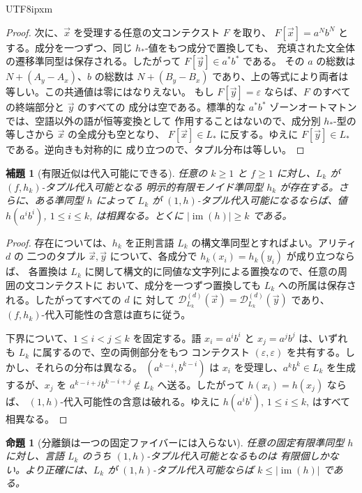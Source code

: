 \documentclass[10pt,a4paper]{article}
\newtheorem{lemma}[theorem]{補題}
\newtheorem{proposition}[theorem]{命題}
\theoremstyle{remark}
\newcommand{\D}{\mathcal{D}}
\newcommand{\tuple}[1]{\vec{#1}}
\newcommand{\eps}{\varepsilon}
\begin{document}
\begin{CJK}{UTF8}{ipxm}
\begin{proof}
次に、\(\tuple x\) を受理する任意の文コンテクスト \(F\) を取り、
\(F[\tuple x]=a^N b^N\) とする。成分を一つずつ、同じ \(h_*\)-値をもつ成分で置換しても、
充填された文全体の遷移準同型は保存される。したがって \(F[\tuple y]\in a^*b^*\) である。
その \(a\) の総数は \(N+(A_y-A_x)\)、\(b\) の総数は
\(N+(B_y-B_x)\) であり、上の等式により両者は等しい。この共通値は零にはなりえない。
もし \(F[\tuple y]=\eps\) ならば、\(F\) のすべての終端部分と \(\tuple y\) のすべての
成分は空である。標準的な \(a^*b^*\) ゾーンオートマトンでは、空語以外の語が恒等変換として
作用することはないので、成分別 \(h_*\)-型の等しさから \(\tuple x\) の全成分も空となり、
\(F[\tuple x]\in L_*\) に反する。ゆえに \(F[\tuple y]\in L_*\) である。逆向きも対称的に
成り立つので、タプル分布は等しい。
\end{proof}

\begin{lemma}[有限近似は代入可能にできる]
\label{lem:finite-approximants-substitutable}
任意の \(k\ge1\) と \(f\ge1\) に対し、\(L_k\) が \((f,h_k)\)-タプル代入可能となる
明示的有限モノイド準同型 \(h_k\) が存在する。さらに、ある準同型 \(h\) によって \(L_k\) が
\((1,h)\)-タプル代入可能になるならば、値
\(h(a^i b^i)\), \(1\le i\le k\), は相異なる。とくに
\(|\operatorname{im}(h)|\ge k\) である。
\end{lemma}

\begin{proof}
存在については、\(h_k\) を正則言語 \(L_k\) の構文準同型とすればよい。アリティ \(d\) の
二つのタプル \(\tuple x,\tuple y\) について、各成分で \(h_k(x_i)=h_k(y_i)\) が成り立つならば、
各置換は \(L_k\) に関して構文的に同値な文字列による置換なので、任意の周囲の文コンテクストに
おいて、成分を一つずつ置換しても \(L_k\) への所属は保存される。したがってすべての \(d\) に
対して \(\D_{L_k}^{(d)}(\tuple x)=\D_{L_k}^{(d)}(\tuple y)\) であり、
\((f,h_k)\)-代入可能性の含意は直ちに従う。

下界について、\(1\le i<j\le k\) を固定する。語
\(x_i=a^i b^i\) と \(x_j=a^j b^j\) は、いずれも \(L_k\) に属するので、空の両側部分をもつ
コンテクスト \((\eps,\eps)\) を共有する。しかし、それらの分布は異なる。
\((a^{k-i},b^{k-i})\) は \(x_i\) を受理し、\(a^k b^k\in L_k\) を生成するが、\(x_j\) を
\(a^{k-i+j}b^{k-i+j}\notin L_k\) へ送る。したがって \(h(x_i)=h(x_j)\) ならば、
\((1,h)\)-代入可能性の含意は破れる。ゆえに
\(h(a^i b^i)\), \(1\le i\le k\), はすべて相異なる。
\end{proof}

\begin{proposition}[分離鎖は一つの固定ファイバーには入らない]
\label{prop:separating-chain-not-one-fiber}
任意の固定有限準同型 \(h\) に対し、言語 \(L_k\) のうち \((1,h)\)-タプル代入可能となるものは
有限個しかない。より正確には、\(L_k\) が \((1,h)\)-タプル代入可能ならば
\(k\le|\operatorname{im}(h)|\) である。
\end{proposition}


\end{CJK}
\end{document}
